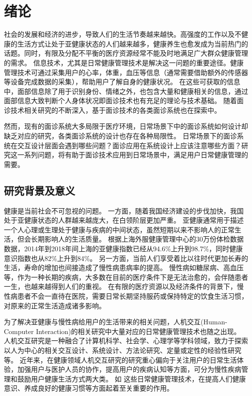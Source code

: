 \chapter{绪论}

社会的发展和经济的进步，导致人们的生活节奏越来越快。高强度的工作以及不健康的生活方式让处于亚健康状态的人们越来越多，健康养生也愈发成为当前热门的话题。同时，有限及分配不平衡的医疗资源经常不能及时地满足广大群众健康管理的需求\cite{雷鹏2019中国医疗资源配置与服务利用现状评价}。
信息技术，尤其是日常健康管理技术是解决这一问题的重要途径。健康管理技术可通过采集用户的心率，体重，血压等信息（通常需要借助额外的传感器等设备完成数据的采集），帮助用户了解自身的健康状况。
在这些可获取的信息中，面部信息除了用于识别身份、情绪之外，也包含大量和健康相关的信息，通过面部信息大致判断个人身体状况即面诊技术也有充足的理论与技术基础\cite{li2020tcminet}。
随着面诊技术相关研究的不断深入，基于面诊技术的各类面诊系统也在探索中\cite{林锋2019中医面诊系统调研报告}。

然而，现有的面诊系统大多局限于医疗环境，日常场景下中的面诊系统如何设计却缺乏对应的研究，各类面诊系统的设计也存在各种局限性。
日常场景下的面诊系统在交互设计层面会遇到哪些问题？面诊应用在系统设计上应该注意哪些方面？研究这一系列问题，将有助于面诊技术应用到日常场景中，满足用户日常健康管理的需要。

\section{研究背景及意义}
健康是当前社会不可忽视的问题。
一方面，随着我国经济建设的步伐加快，我国处于亚健康状态的人群越来越庞大，在白领阶层更加严重。
亚健康通常用于描述一个人心理或生理处于健康与疾病的中间状态，虽然短期以来不影响人的正常生活，但会长期影响人的生活质量。
根据上海外服健康管理中心的30万份体检数据数据，2014年到2018年间上海的亚健康指数已经从94.6\%上升到98.7\%，同时健康意识指数也从82\%上升到84\%\cite{health_report2019}。
另一方面，当前人们享受着比以往时代更加长寿的生活，寿命的增加也间接造成了慢性病患病率的提高。
慢性病如糖尿病、高血压等，作为一种长期的疾病，大多数在目前的医疗条件下是无法治愈的，会伴随患者一生，也越来越得到人们的重视\cite{blandford2019hci, Ben2002A}。
在有限的医疗资源以及经济条件的背景下，慢性病患者不会一直待在医院，需要日常长期坚持服药或保持特定的饮食生活习惯，对原来的正常生活造成诸多影响\cite{lupton2017self}。

为了解决亚健康与慢性病给用户的生活带来的相关问题，人机交互(Human-Computer Interaction)的相关研究中大量对应的日常健康管理技术也随之出现。
人机交互研究是一种融合了计算机科学、社会学、心理学等学科领域，致力于探索以人为中心的相关交互设计、系统设计、方法论研究、定量或定性的经验性研究等\cite{lazar2017research}。
近年来，在健康领域人机交互研究的研究重心偏向于关注用户的日常生活体验，加强用户与医护人员的协作，提高用户的疾病认知等方面，可分为慢性疾病管理和鼓励用户健康生活方式两大类。
如
这些日常健康管理技术，在提高人们健康意识、养成良好的健康习惯等方面起着至关重要的作用\cite{ayobi2017quantifying}。

